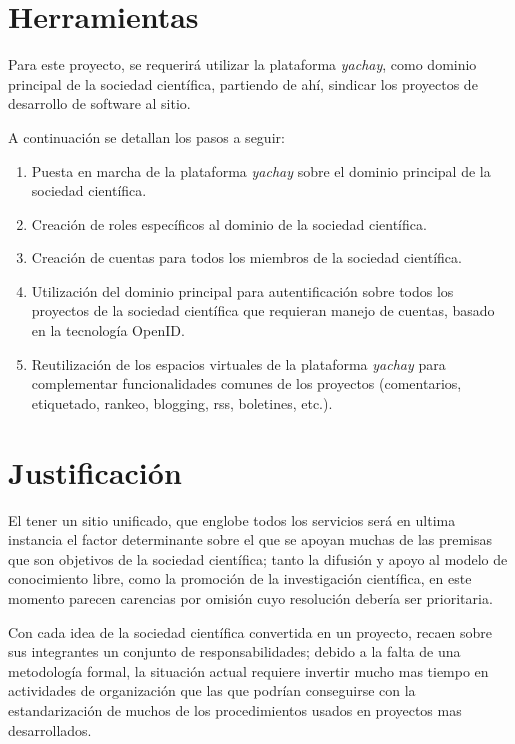 \documentclass[letter,12pt]{article}
\begin{document}
\section{Herramientas}
Para este proyecto, se requerirá utilizar la plataforma \emph{yachay}, como dominio principal de
la sociedad científica, partiendo de ahí, sindicar los proyectos de desarrollo de software al
sitio.

A continuación se detallan los pasos a seguir:

\begin{enumerate}
\item Puesta en marcha de la plataforma \emph{yachay} sobre el dominio principal de la sociedad
científica.
\item Creación de roles específicos al dominio de la sociedad científica.
\item Creación de cuentas para todos los miembros de la sociedad científica.
\item Utilización del dominio principal para autentificación sobre todos los proyectos de la
sociedad científica que requieran manejo de cuentas, basado en la tecnología OpenID.
\item Reutilización de los espacios virtuales de la plataforma \emph{yachay} para complementar funcionalidades comunes de los proyectos (comentarios, etiquetado, rankeo, blogging, rss, boletines, etc.).
\end{enumerate}

\section{Justificación}
El tener un sitio unificado, que englobe todos los servicios será en ultima instancia el factor
determinante sobre el que se apoyan muchas de las premisas que son objetivos de la sociedad
científica; tanto la difusión y apoyo al modelo de conocimiento libre, como la promoción de la
investigación científica, en este momento parecen carencias por omisión cuyo resolución debería ser
prioritaria.

Con cada idea de la sociedad científica convertida en un proyecto, recaen sobre sus integrantes un
conjunto de responsabilidades; debido a la falta de una metodología formal, la situación actual
requiere invertir mucho mas tiempo en actividades de organización que las que podrían conseguirse
con la estandarización de muchos de los procedimientos usados en proyectos mas desarrollados.
\end{document}
